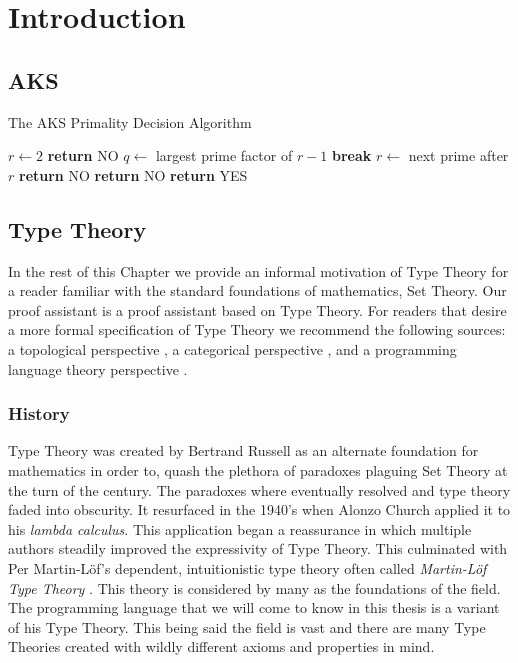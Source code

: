 \documentclass[./Thesis.tex]{subfiles}
\begin{document}
\chapter{Introduction}
\label{chap:Introduction}
\section{AKS}

\begin{algorithm}[H]
  \caption{The AKS Primality Decision Algorithm}
  \label{fig:prime-slow}
  \begin{algorithmic}
    \State $r \leftarrow 2$
        \State \textbf{return} NO
      \EndIf
      \State $q \leftarrow$ largest prime factor of $r - 1$
        \State \textbf{break}
      \EndIf
      \State $r \leftarrow$ next prime after $r$
    \EndWhile
        \State \textbf{return} NO
      \EndIf
    \EndFor
      \State \textbf{return} NO
    \Else
      \State \textbf{return} YES
    \EndIf
    \EndFunction
  \end{algorithmic}
\end{algorithm}
\section{Type Theory}
In the rest of this Chapter we provide an informal motivation of Type Theory for a reader
familiar with the standard foundations of mathematics, Set Theory. Our proof
assistant \Agda{} is a proof assistant based on Type Theory. For readers that
desire a more formal specification of Type Theory we recommend the following
sources: a topological perspective \cite{hott-book}, a categorical perspective
\cite{nlab}, and a programming language theory perspective \cite{harper}.
\subsection{History}
\label{sec:history}
Type Theory was created by Bertrand Russell as an alternate foundation for
mathematics in order to, quash the plethora of
paradoxes plaguing Set Theory at the turn of the century. The paradoxes
where eventually resolved and type theory faded into obscurity. It resurfaced in
the 1940's when Alonzo Church applied it to his \textit{lambda calculus}. This
application began a reassurance in which multiple authors steadily improved the
expressivity of Type Theory. This culminated with Per Martin-L\"{o}f's
dependent, intuitionistic type theory often called
\textit{Martin-L\"{o}f Type Theory} \cite{martin-lof}.
This theory is considered by many as the foundations of the field. The
programming language \Agda{} that we will come to know in this thesis is a
variant of his Type Theory. This being said the field is vast and there are many
Type Theories created with wildly different axioms and properties in mind.
\end{document}
